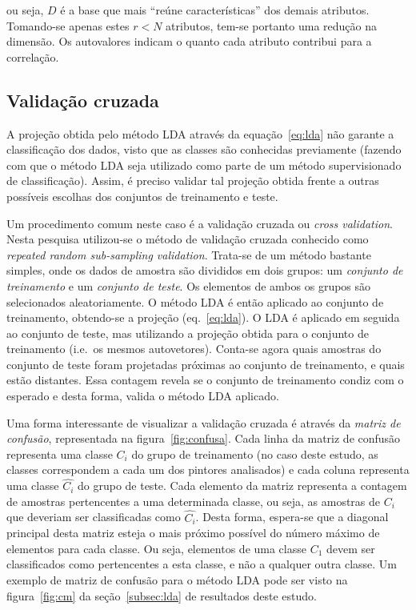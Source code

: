 \noindent ou seja, $D$ é a base que mais ``reúne características'' dos demais
atributos. Tomando-se apenas estes $r < N$ atributos, tem-se portanto uma
redução na dimensão. Os autovalores indicam o quanto cada
atributo contribui para a correlação.~\cite{luciano}

\subsection{Validação cruzada}

A projeção obtida pelo método LDA através da equação~\ref{eq:lda} não
garante a classificação dos dados, visto que as classes são conhecidas
previamente (fazendo com que o método LDA seja utilizado como parte de
um método supervisionado de classificação). Assim, é preciso validar
tal projeção obtida frente a outras possíveis escolhas dos conjuntos
de treinamento e teste.

Um procedimento comum neste caso é a validação cruzada ou
\textit{cross validation}. Nesta pesquisa utilizou-se o método de validação cruzada conhecido como \textit{repeated random sub-sampling validation}. Trata-se de um método bastante simples,
onde os dados de amostra são divididos em dois grupos: um
\emph{conjunto de treinamento} e um \emph{conjunto de teste}. Os elementos de ambos os grupos são selecionados aleatoriamente. O método
LDA é então aplicado ao conjunto de treinamento, obtendo-se a projeção
(eq.~\ref{eq:lda}). O LDA é aplicado em seguida ao conjunto de teste,
mas utilizando a projeção obtida para o conjunto de treinamento (i.e.\
os mesmos autovetores). Conta-se agora quais amostras do conjunto de
teste foram projetadas próximas ao conjunto de treinamento, e quais
estão distantes. Essa contagem revela se o conjunto de treinamento
condiz com o esperado e desta forma, valida o método LDA aplicado.~\cite{luciano}

Uma forma interessante de visualizar a validação cruzada é através da
\emph{matriz de confusão}, representada na
figura~\ref{fig:confusa}. Cada linha da matriz de confusão representa
uma classe $C_i$ do grupo de treinamento (no caso deste estudo, as
classes correspondem a cada um dos pintores analisados) e cada coluna
representa uma classe $\hat{C_i}$ do grupo de teste. Cada elemento da
matriz representa a contagem de amostras pertencentes a uma
determinada classe, ou seja, as amostras de $C_i$ que deveriam ser
classificadas como $\hat{C_i}$. Desta forma, espera-se que a diagonal
principal desta matriz esteja o mais próximo possível do número máximo
de elementos para cada classe. Ou seja, elementos de uma classe $C_1$
devem ser classificados como pertencentes a esta classe, e não a
qualquer outra classe. Um exemplo de matriz de confusão para o método
LDA pode ser visto na figura~\ref{fig:cm} da seção~\ref{subsec:lda} de
resultados deste estudo.

